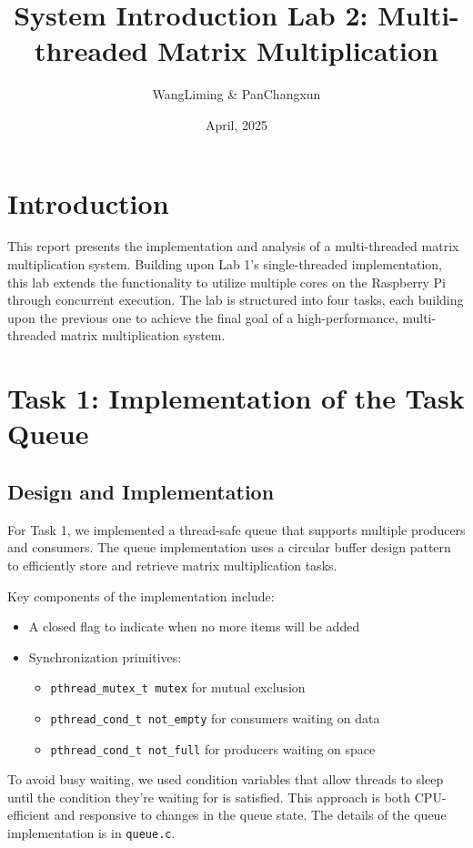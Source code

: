 \documentclass[11pt,a4paper]{article}
\title{\textbf{System Introduction Lab 2: Multi-threaded Matrix Multiplication}}
\author{WangLiming \& PanChangxun}
\date{April, 2025}
\begin{document}
\maketitle

\section{Introduction}
This report presents the implementation and analysis of a multi-threaded matrix multiplication system. Building upon Lab 1's single-threaded implementation, this lab extends the functionality to utilize multiple cores on the Raspberry Pi through concurrent execution. The lab is structured into four tasks, each building upon the previous one to achieve the final goal of a high-performance, multi-threaded matrix multiplication system.

\section{Task 1: Implementation of the Task Queue}

\subsection{Design and Implementation}
For Task 1, we implemented a thread-safe queue that supports multiple producers and consumers. The queue implementation uses a circular buffer design pattern to efficiently store and retrieve matrix multiplication tasks.

Key components of the implementation include:
\begin{itemize}
    \item A closed flag to indicate when no more items will be added
    \item Synchronization primitives:
    \begin{itemize}
        \item \texttt{pthread\_mutex\_t mutex} for mutual exclusion
        \item \texttt{pthread\_cond\_t not\_empty} for consumers waiting on data
        \item \texttt{pthread\_cond\_t not\_full} for producers waiting on space
    \end{itemize}
\end{itemize}

To avoid busy waiting, we used condition variables that allow threads to sleep until the condition they're waiting for is satisfied. This approach is both CPU-efficient and responsive to changes in the queue state. The details of the queue implementation is in \texttt{queue.c}.
\end{document}
